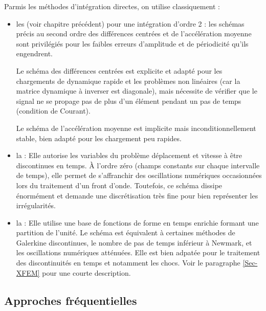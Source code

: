 Parmis les méthodes d'intégration directes, on utilise classiquement :
\begin{itemize}
	\item les  (voir chapitre précédent) pour une intégration d'ordre 2 :
		les schémas précis au second ordre des différences centrées et de 
		l'accélération moyenne sont privilégiés pour les faibles erreurs d'amplitude
		et de périodicité qu'ils engendrent.
		
		Le schéma des différences centrées
		est explicite et adapté pour les chargements de dynamique rapide et les
		problèmes non linéaires (car la matrice dynamique à inverser est diagonale),
		mais nécessite de vérifier que le signal ne se propage pas de plus d'un élément
		pendant un pas de temps (condition de Courant).
		
		Le schéma de l'accélération moyenne est implicite mais inconditionnellement
		stable, bien adapté pour les chargement peu rapides.
	\item la :
		Elle autorise les variables du problème déplacement et vitesse à être
		discontinues en temps.
		À l'ordre zéro (champs constants sur chaque intervalle de temps), elle permet
		de s'affranchir des oscillations numériques occasionnées lors du traitement
		d'un front d'onde.
		Toutefois, ce schéma dissipe énormément et demande une discrétisation
		très fine pour bien représenter les irrégularités.
	\item la :
		Elle utilise une base de fonctions de forme en temps enrichie formant une partition de l'unité.
		Le schéma est équivalent à certaines méthodes de Galerkine discontinues, le nombre de
		pas de temps inférieur à Newmark, et les oscillations numériques atténuées.
		Elle est bien adpatée pour le traitement des discontinuités en temps et
		notamment les chocs. Voir le paragraphe \ref{Sec-XFEM} pour une courte description.
\end{itemize}

\medskip
\subsection{Approches fréquentielles}

